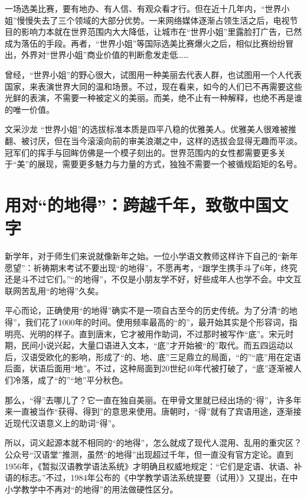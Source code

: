 一场选美比赛，要有地办、有人信、有观众看才行。但在近十几年内，“世界小姐”慢慢失去了三个领域的大部分优势。一来网络媒体逐渐占领生活之后，电视节目的影响力本就在世界范围内大大降低，让城市在“世界小姐”里露脸打广告，已然成为落伍的手段。再者，“世界小姐”等国际选美比赛爆火之后，相似比赛纷纷冒出，外界对“世界小姐”商业价值的判断愈发走低……

曾经，“世界小姐”的野心很大，试图用一种美丽去代表人群，也试图用一个人代表国家，来表演世界大同的温和场景。不过，现在看来，如今的人们已不再需要这些光鲜的表演，不需要一种被定义的美丽。而美，绝不止有一种解释，也绝不再是谁的唯一价值。

\begin{quoteBox}{文采沙龙}
“世界小姐”的选拔标准本质是四平八稳的优雅美人。优雅美人很难被推翻、被讨厌，但在当今滚滚向前的审美浪潮之中，这样的选拔会显得无趣而平淡。冠军们的挥手与回眸仿佛是一个模子刻出的。世界范围内的女性都需要更多关于“美”的展现，需要更多魅力与力量的方式，独独不需要一个被循规蹈矩的名号。
\end{quoteBox}

\clearpage
\section*{用对“的地得”：跨越千年，致敬中国文字}

新学年，对于师生们来说就像新年之始。一位小学语文教师这样许下自己的“新年愿望”：祈祷期末考试不要出现“的地得”，不愿再考，“跟学生携手斗了6年，终究还是斗不过它们。”“的地得”，不仅是小朋友学不好，好些成年人也学不会。中文互联网苦乱用“的地得”久矣。

平心而论，正确使用“的地得”确实不是一项自古至今的历史传统。为了分清“的地得”，我们花了1000年的时间。使用频率最高的“的”，最开始其实是个形容词，指明亮、光明的样子。直到唐末，它才被用作助词，不过那时被写作“底”。宋元时期，民间小说兴起，大量口语进入文本，“底”才开始被“的”取代。而五四运动以后，汉语受欧化的影响，形成了“的、地、底”三足鼎立的局面，“的”“底”用在定语后面，状语后面用“地”。不过，这种局面到20世纪40年代被打破了，“底”逐渐被人们冷落，成了“的”“地”平分秋色。

那么，“得”去哪儿了？它一直在独自美丽。在甲骨文里就已经出场的“得”，许多年来一直被当作“获得、得到”的意思来使用。唐朝时，“得”就有了宾语用途，逐渐接近现代汉语意义上的助词“得”。

所以，词义起源本就不相同的“的地得”，怎么就成了现代人混用、乱用的重灾区？公众号“汉语堂”推测，虽然“的地得”出现超过千年，但一直没有官方定论。直到1956年，《暂拟汉语教学语法系统》才明确且权威地规定：“它们是定语、状语、补语的标志。”不过，1984年公布的《中学教学语法系统提要（试用）》又提出，在中小学教学中不再对“的地得”的用法做硬性区分。

